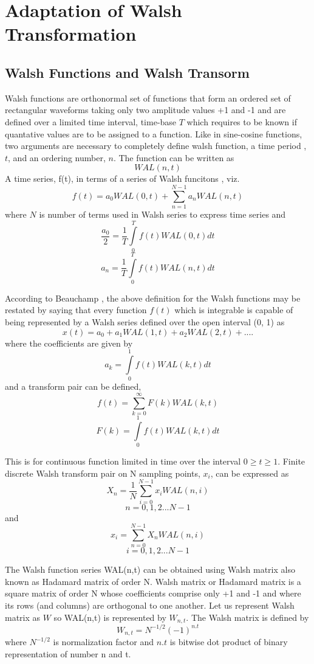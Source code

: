 \chapter{Adaptation of Walsh Transformation} \label{ch:walsh transformation}

\section{Walsh Functions and Walsh Transorm}
Walsh functions are orthonormal set of functions that form an ordered set of rectangular waveforms taking 
only two amplitude values +1 and -1 and are defined over a limited time interval, time-base $T$ which requires to be known if quantative values are to be assigned to a function. Like in sine-cosine functions, two arguments are necessary to completely define 
walsh function, a time period , $t$, and an ordering number, $n$. The function can be written as
\[
WAL(n,t)
\]
A time series, f(t), in terms of a series of Walsh funcitons \cite{Beauchamp1975}, viz.
\[
f(t) = a_{0} WAL(0, t) + \sum_{n=1}^{N-1} a_n WAL(n,t)
\]
where $N$ is number of terms used in Walsh series to express time series and
\[
\frac{a_0}{2} = \frac{1}{T} \int\limits_0^T f(t) WAL(0,t) dt
\]
\[
a_n = \frac{1}{T} \int\limits_0^T f(t) WAL(n,t) dt
\]

According to Beauchamp \cite{Beauchamp1975}, the above definition for the Walsh functions may be restated by saying that every function $f(t)$ which is integrable is capable of being represented by a Walsh series defined over the open interval (0, 1) as 
\[
x(t) = a_0 + a_1 WAL(1,t) + a_2 WAL(2,t) + ....
\]
where the coefficients are given by
\[
a_k = \int\limits_0^1 f(t) WAL(k,t) dt
\]
and a transform pair can be defined,
\[
f(t) = \sum_{k=0}^\infty F(k) WAL(k,t)
\]
\[
F(k) = \int\limits_0^1 f(t) WAL(k,t) dt
\]

This is for continuous function limited in time over the interval $0 \geqslant t \geqslant 1$. Finite discrete Walsh transform pair on N sampling points, $x_i$, can be expressed as
\[
X_n = \frac{1}{N} \sum_{i=0}^{N-1} x_i WAL(n,i)
\]
\[
n = 0, 1, 2...N-1
\]
and
\[
x_i = \sum_{n=0}^{N-1} X_n WAL(n,i)
\]
\[
i = 0, 1, 2...N-1
\]

The Walsh function series WAL(n,t) can be obtained using Walsh matrix also known as Hadamard matrix of order N. 
Walsh matrix or Hadamard matrix is a square matrix of order N whose coefficients comprise only +1 and -1 and where its rows 
(and columns) are orthogonal to one another. 
Let us represent Walsh matrix as $W$ so WAL(n,t) is represented by $W_{n,t}$. The Walsh matrix is defined by
\[
W_{n,t} = N^{-1/2} (-1)^{n.t}
\]
where $N^{-1/2}$ is normalization factor and $n.t$ is bitwise dot product of binary representation of number n and t.

